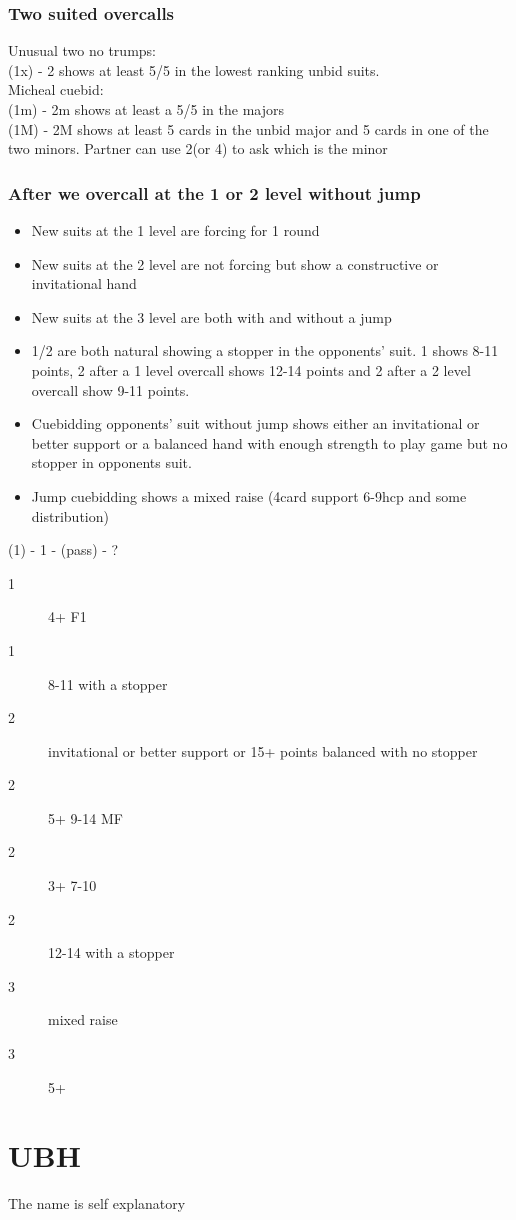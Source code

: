 \documentclass[11pt]{article}
\begin{document}
\subsubsection*{Two suited overcalls}
\label{sec:org783bd26}
Unusual two no trumps:\\
(1x) - 2 shows at least 5/5 in the lowest ranking unbid suits. \\
Micheal cuebid:\\
(1m) - 2m shows at least a 5/5 in the majors\\

(1M) - 2M shows at least 5 cards in the unbid major and 5 cards in one of the two minors. Partner can use 2(or 4) to ask which is the minor\\
\subsubsection*{After we overcall at the 1 or 2 level without jump}
\label{sec:orge9e54bc}
\begin{itemize}
\item New suits at the 1 level are forcing for 1 round
\item New suits at the 2 level are not forcing but show a constructive or invitational hand
\item New suits at the 3 level are both with and without a jump
\item 1/2 are both natural showing a stopper in the opponents’ suit. 1 shows 8-11 points, 2 after a 1 level overcall shows 12-14 points and 2 after a 2 level overcall show 9-11 points.
\item Cuebidding opponents' suit without jump shows either an invitational or better support or a balanced hand with enough strength to play game but no stopper in opponents suit.
\item Jump cuebidding shows a mixed raise (4card support 6-9hcp and some distribution)
\end{itemize}

(1) - 1 - (pass) - ? 
\begin{description}
\item[{1}] 4+ F1
\item[{1}] 8-11 with a stopper
\item[{2}] invitational or better support or 15+ points balanced with no stopper
\item[{2}] 5+ 9-14 MF
\item[{2}] 3+ 7-10
\item[{2}] 12-14 with a stopper
\item[{3}] mixed raise
\item[{3}] 5+
\end{description}
\section*{UBH}
\label{sec:orga7d8cbe}
The name is self explanatory
\end{document}
